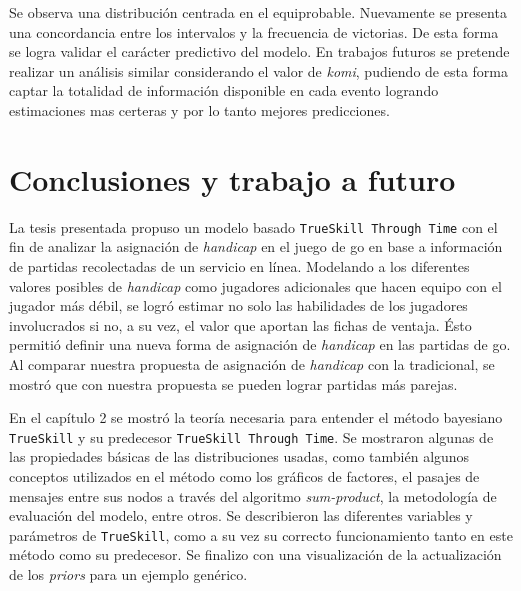 \documentclass[11pt,twoside,spanish]{report} %
\begin{document}
Se observa una distribuci\'on centrada en el equiprobable.
Nuevamente se presenta una concordancia entre los intervalos y la frecuencia de victorias.
De esta forma se logra validar el car\'acter predictivo del modelo.
En trabajos futuros se pretende realizar un an\'alisis similar considerando el valor de \textit{komi}, pudiendo de esta forma captar la totalidad de informaci\'on disponible en cada evento logrando estimaciones mas certeras y por lo tanto mejores predicciones.


\chapter{Conclusiones y trabajo a futuro}


La tesis presentada propuso un modelo basado \texttt{TrueSkill Through Time} con el fin de analizar la asignaci\'on de \textit{handicap} en el juego de go en base a informaci\'on de partidas recolectadas de un servicio en l\'inea.
Modelando a los diferentes valores posibles de \textit{handicap} como jugadores adicionales que hacen equipo con el jugador m\'as d\'ebil, se logr\'o estimar no solo las habilidades de los jugadores involucrados si no, a su vez, el valor que aportan las fichas de ventaja. 
Ésto permiti\'o definir una nueva forma de asignaci\'on de \textit{handicap} en las partidas de go.
Al comparar nuestra propuesta de asignaci\'on de \textit{handicap} con la tradicional, se mostr\'o que con nuestra propuesta se pueden lograr partidas m\'as parejas. 

En el cap\'itulo 2 se mostr\'o la teor\'ia necesaria para entender el m\'etodo bayesiano  \texttt{TrueSkill} y  su predecesor \texttt{TrueSkill Through Time}.
Se mostraron algunas de las propiedades b\'asicas de las distribuciones usadas, como tambi\'en algunos conceptos utilizados en el m\'etodo como los gr\'aficos de factores, el pasajes de mensajes entre sus nodos a trav\'es del algoritmo \textit{sum-product}, la metodolog\'ia de evaluaci\'on del modelo, entre otros.
Se describieron las diferentes variables y par\'ametros de \texttt{TrueSkill}, como a su vez su correcto funcionamiento tanto en este m\'etodo como su predecesor.
Se finalizo con una visualizaci\'on de la actualizaci\'on de los \textit{priors} para un ejemplo gen\'erico. 
\end{document}
